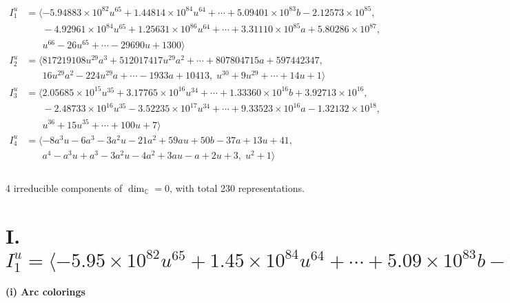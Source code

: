 \documentclass[1p]{elsarticle_modified}
\theoremstyle{definition}
\begin{document}
\begin{align*}
I^u_{1}&=\langle 
-5.94883\times10^{82} u^{65}+1.44814\times10^{84} u^{64}+\cdots+5.09401\times10^{83} b-2.12573\times10^{85},\\
\phantom{I^u_{1}}&\phantom{= \langle  }-4.92961\times10^{84} u^{65}+1.25631\times10^{86} u^{64}+\cdots+3.31110\times10^{85} a+5.80286\times10^{87},\\
\phantom{I^u_{1}}&\phantom{= \langle  }u^{66}-26 u^{65}+\cdots-29690 u+1300\rangle \\
I^u_{2}&=\langle 
817219108 u^{29} a^3+512017417 u^{29} a^2+\cdots+807804715 a+597442347,\\
\phantom{I^u_{2}}&\phantom{= \langle  }16 u^{29} a^2-224 u^{29} a+\cdots-1933 a+10413,\;u^{30}+9 u^{29}+\cdots+14 u+1\rangle \\
I^u_{3}&=\langle 
2.05685\times10^{15} u^{35}+3.17765\times10^{16} u^{34}+\cdots+1.33360\times10^{16} b+3.92713\times10^{16},\\
\phantom{I^u_{3}}&\phantom{= \langle  }-2.48733\times10^{16} u^{35}-3.52235\times10^{17} u^{34}+\cdots+9.33523\times10^{16} a-1.32132\times10^{18},\\
\phantom{I^u_{3}}&\phantom{= \langle  }u^{36}+15 u^{35}+\cdots+100 u+7\rangle \\
I^u_{4}&=\langle 
-8 a^3 u-6 a^3-3 a^2 u-21 a^2+59 a u+50 b-37 a+13 u+41,\\
\phantom{I^u_{4}}&\phantom{= \langle  }a^4- a^3 u+a^3-3 a^2 u-4 a^2+3 a u- a+2 u+3,\;u^2+1\rangle \\
\\
\end{align*}
\raggedright * 4 irreducible components of $\dim_{\mathbb{C}}=0$, with total 230 representations.\\
\newpage
\renewcommand{\arraystretch}{1}
\centering \section*{I. $I^u_{1}= \langle -5.95\times10^{82} u^{65}+1.45\times10^{84} u^{64}+\cdots+5.09\times10^{83} b-2.13\times10^{85},\;-4.93\times10^{84} u^{65}+1.26\times10^{86} u^{64}+\cdots+3.31\times10^{85} a+5.80\times10^{87},\;u^{66}-26 u^{65}+\cdots-29690 u+1300 \rangle$}
\flushleft \textbf{(i) Arc colorings}\\
\end{document}
